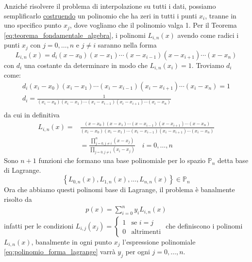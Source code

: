 \documentclass{article}
\begin{document}
Anziché risolvere il problema di interpolazione su tutti i dati, possiamo
semplificarlo \underline{costruendo} un polinomio che ha zeri in tutti i punti
$x_i$, tranne in uno specifico punto $x_j$, dove vogliamo che il polinomio
valga 1. Per il Teorema \ref{eq:teorema_fondamentale_algebra}, i polinomi
$L_{i,n}(x)$ avendo come radici i punti $x_j$ con $j=0,\ldots,n$ e $j\neq i$
saranno nella forma
$$L_{i,n}(x)=d_i(x-x_0)(x-x_1)\cdots(x-x_{i-1})(x-x_{i+1})\cdots(x-x_n)$$ con
$d_i$ una costante da determinare in modo che $L_{i,n}(x_i)=1$. Troviamo $d_i$
come:
\begin{equation*}
   \begin{aligned}
       d_i(x_i-x_0)(x_i-x_1)\cdots(x_i-x_{i-1})(x_i-x_{i+1})\cdots(x_i-x_n)=1\\ 
       d_i=\frac{1}{(x_i-x_0)(x_i-x_1)\cdots(x_i-x_{i-1})(x_i-x_{i+1})\cdots(x_i-x_n)}\\ 
   \end{aligned}
\end{equation*}
da cui in definitiva
\begin{equation*}
   \begin{aligned}
       L_{i,n}(x)=&\frac{(x-x_0)(x-x_1)\cdots(x-x_{i-1})(x-x_{i+1})\cdots(x-x_n)}{(x_i-x_0)(x_i-x_1)\cdots(x_i-x_{i-1})(x_i-x_{i+1})\cdots(x_i-x_n)}
       \\ 
       &=\frac{\prod_{j=0,j\neq i}^n(x-x_j)}{\prod_{j=0,j\neq
       i}(x_i-x_j)}\quad i=0,\ldots,n
   \end{aligned} 
\end{equation*}
Sono $n+1$ funzioni che formano una base polinomiale per lo spazio
$\mathbb{P}_n$ detta base di Lagrange.
$$\left\{L_{0,n}(x),L_{1,n}(x),\ldots,L_{n,n}(x)\right\}\in \mathbb{P}_ n$$
Ora che abbiamo questi polinomi base di Lagrange, il problema è banalmente
risolto da 
\begin{equation}\label{eq:polinomio_forma_lagrange}
    \begin{aligned}
        p(x)=\displaystyle\sum_{i=0}^{n}y_iL_{i,n}(x)
    \end{aligned}
\end{equation}
infatti per le condizioni $L_{i,j}(x_j)=\begin{cases}
    1 & \text{se }i=j\\ 
    0 & \text{altrimenti}
\end{cases}$ che definiscono i polinomi $L_{i,n}(x)$,
banalmente in ogni punto $x_j$ l'espressione polinomiale
\ref{eq:polinomio_forma_lagrange} varrà $y_j$ per ogni $j=0,\ldots,n$.
\end{document}
